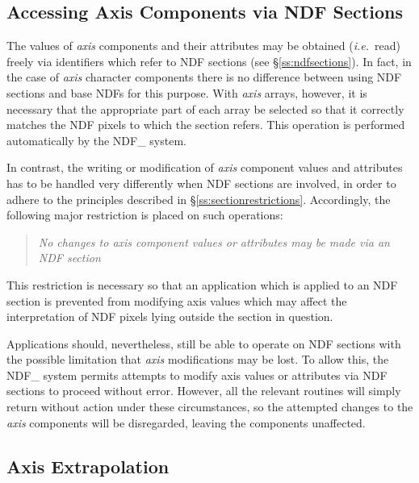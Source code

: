 \documentclass[twoside,11pt]{article}
\newcommand{\xlabel}[1]{}
\newcommand{\st}[1]{{\em{#1}}}
\begin{document}
\subsection{\xlabel{accessing_axis_components_via_ndf_sections}Accessing Axis Components via NDF Sections}

The values of \st{axis\/} components and their attributes may be obtained
(\st{i.e.}\ read) freely via identifiers which refer to NDF sections (see
\S\ref{ss:ndfsections}). 
In fact, in the case of \st{axis\/} character components there is no
difference between using NDF sections and base NDFs for this purpose. 
With \st{axis\/} arrays, however, it is necessary that the appropriate
part of each array be selected so that it correctly matches the NDF pixels
to which the section refers. 
This operation is performed automatically by the NDF\_ system.

In contrast, the writing or modification of \st{axis\/} component values
and attributes has to be handled very differently when NDF sections are
involved, in order to adhere to the principles described in
\S\ref{ss:sectionrestrictions}. 
Accordingly, the following major restriction is placed on such operations:

\begin{quote}
\begin{center}
\st{No changes to axis component values or attributes may be made via an 
NDF section}
\end{center}
\end{quote}

This restriction is necessary so that an application which is applied to an
NDF section is prevented from modifying axis values which may affect the
interpretation of NDF pixels lying outside the section in question. 

Applications should, nevertheless, still be able to operate on NDF sections
with the possible limitation that \st{axis\/} modifications may be lost. 
To allow this, the NDF\_ system permits attempts to modify axis values or
attributes via NDF sections to proceed without error. 
However, all the relevant routines will simply return without action under
these circumstances, so the attempted changes to the \st{axis\/} components
will be disregarded, leaving the components unaffected. 

\subsection{\xlabel{axis_extrapolation}Axis Extrapolation}
\end{document}
